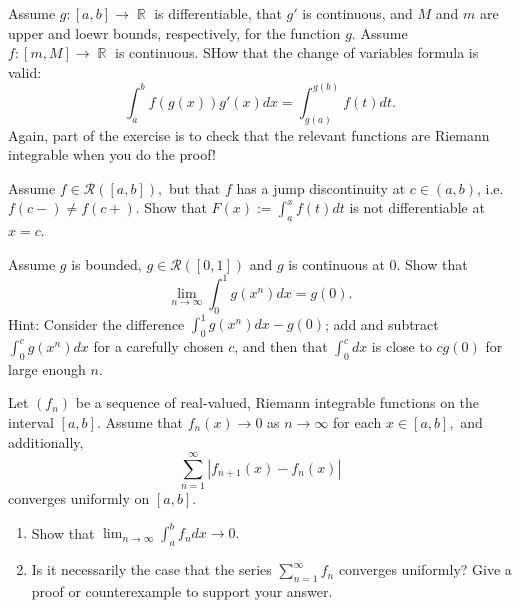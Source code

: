 \documentclass[12pt,letterpaper,boxed]{hmcpset}
\DeclareMathOperator{\R}{\mathbb{R}}
\begin{document}
\begin{problem}[Exercise 2.17]
Assume $g : [a, b] \rightarrow \R$ is differentiable, that $g'$ is continuous, and $M$ and $m$ are upper and loewr bounds, respectively, for the function $g$. Assume $f : [m,M]\rightarrow\R$ is continuous. SHow that the change of variables formula is valid: $$\int_{a}^{b}f(g(x))g'(x)dx = \int_{g(a)}^{g(b)}f(t)dt.$$ Again, part of the exercise is to check that the relevant functions are Riemann integrable when you do the proof!
\end{problem}

\begin{solution}

\end{solution}

\begin{problem}[Exercise 2.18]
Assume $f \in \mathcal{R}([a,b]),$ but that $f$ has a jump discontinuity at $c \in (a,b)$, i.e. $f(c-)\neq f(c+).$ Show that $F(x) := \int_{a}^{x} f(t)dt$ is not differentiable at $x=c$.
\end{problem}

\begin{solution}

\end{solution}

\begin{problem}[Exercise 2.20]
Assume $g$ is bounded, $g \in \mathcal{R}([0,1])$ and $g$ is continuous at 0. Show that $$\lim_{n\rightarrow \infty}\int_{0}^{1}g(x^{n})dx = g(0).$$ Hint: Consider the difference $\int_{0}^{1}g(x^{n})dx - g(0)$; add and subtract $\int_{0}^{c} g(x^{n})dx$ for a carefully chosen $c$, and then that $\int_{0}^{c}dx$ is close to $cg(0)$ for large enough $n.$
\end{problem}

\begin{solution}

\end{solution}

\begin{problem}[Exercise 3.3]
Let $(f_n)$ be a sequence of real-valued, Riemann integrable functions on the interval $[a,b]$. Assume that $f_{n}(x)\rightarrow 0$ as $n\rightarrow\infty$ for each $x\in[a,b],$ and additionally, $$\sum_{n=1}^{\infty}|f_{n + 1}(x) - f_{n}(x)|$$ converges uniformly on $[a,b]$.
\begin{enumerate}
    \item Show that $\lim_{n \rightarrow\infty}\int_{a}^{b}f_n dx \rightarrow 0.$
    \item Is it necessarily the case that the series $\sum_{n=1}^{\infty}f_n$ converges uniformly? Give a proof or counterexample to support your answer.
\end{enumerate}
\end{problem}

\begin{solution}
\end{solution}
\end{document}
